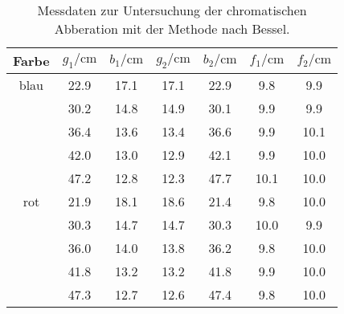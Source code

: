 \begin{table}[H]
\centering
\caption{Messdaten zur Untersuchung der chromatischen Abberation mit der Methode nach Bessel.}
\label{tab: colors}
\begin{tabular}{S S S S S S S }
\toprule
{Farbe} & {$g_1 / \si{\centi\meter}$} & {$b_1 / \si{\centi\meter}$} &{$g_2 / \si{\centi\meter}$} &
{$b_2 / \si{\centi\meter}$} & {$f_1 / \si{\centi\meter}$}  & {$f_2 / \si{\centi\meter}$}  \\
\midrule
 blau  & 22.9  & 17.1  & 17.1  & 22.9  & 9.8  & 9.9\\
  & 30.2  & 14.8  & 14.9  & 30.1  & 9.9  & 9.9\\
  & 36.4  & 13.6  & 13.4  & 36.6  & 9.9  & 10.1\\
  & 42.0  & 13.0  & 12.9  & 42.1  & 9.9  & 10.0\\
  & 47.2  & 12.8  & 12.3  & 47.7  & 10.1  & 10.0\\
rot  & 21.9  & 18.1  & 18.6  & 21.4  & 9.8  & 10.0\\
  & 30.3  & 14.7  & 14.7  & 30.3  & 10.0  & 9.9\\
  & 36.0  & 14.0  & 13.8  & 36.2  & 9.8  & 10.0\\
  & 41.8  & 13.2  & 13.2  & 41.8  & 9.9  & 10.0\\
  & 47.3  & 12.7  & 12.6  & 47.4  & 9.8  & 10.0\\
\bottomrule
\end{tabular}
\end{table}
